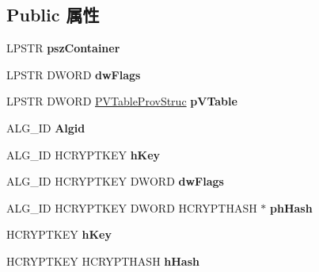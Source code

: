 \subsection*{Public 属性}
\begin{DoxyCompactItemize}
\item 
\mbox{\label{structtag_p_r_o_v_f_u_n_c_s_ae9bd38731e92c115593cecb5da31703e}} 
L\+P\+S\+TR {\bfseries psz\+Container}
\item 
\mbox{\label{structtag_p_r_o_v_f_u_n_c_s_adebac8103e4303495bb23953f9ec3e6d}} 
L\+P\+S\+TR D\+W\+O\+RD {\bfseries dw\+Flags}
\item 
\mbox{\label{structtag_p_r_o_v_f_u_n_c_s_a2a0846f23b6aa81d9a39ae25eb658aa1}} 
L\+P\+S\+TR D\+W\+O\+RD \hyperlink{struct___v_table_prov_struc}{P\+V\+Table\+Prov\+Struc} {\bfseries p\+V\+Table}
\item 
\mbox{\label{structtag_p_r_o_v_f_u_n_c_s_a354607edce501916a5040facf726cd4c}} 
A\+L\+G\+\_\+\+ID {\bfseries Algid}
\item 
\mbox{\label{structtag_p_r_o_v_f_u_n_c_s_a2d685123f290cb43911336f287652b05}} 
A\+L\+G\+\_\+\+ID H\+C\+R\+Y\+P\+T\+K\+EY {\bfseries h\+Key}
\item 
\mbox{\label{structtag_p_r_o_v_f_u_n_c_s_aac8997d99ebdb1caa587be8a33acf001}} 
A\+L\+G\+\_\+\+ID H\+C\+R\+Y\+P\+T\+K\+EY D\+W\+O\+RD {\bfseries dw\+Flags}
\item 
\mbox{\label{structtag_p_r_o_v_f_u_n_c_s_a9db84dfb48d46edd83e10d1c95962f1b}} 
A\+L\+G\+\_\+\+ID H\+C\+R\+Y\+P\+T\+K\+EY D\+W\+O\+RD H\+C\+R\+Y\+P\+T\+H\+A\+SH $\ast$ {\bfseries ph\+Hash}
\item 
\mbox{\label{structtag_p_r_o_v_f_u_n_c_s_a2d685123f290cb43911336f287652b05}} 
H\+C\+R\+Y\+P\+T\+K\+EY {\bfseries h\+Key}
\item 
\mbox{\label{structtag_p_r_o_v_f_u_n_c_s_a2c67c268ec95ccf367c2715aaa8805f6}} 
H\+C\+R\+Y\+P\+T\+K\+EY H\+C\+R\+Y\+P\+T\+H\+A\+SH {\bfseries h\+Hash}

\end{DoxyCompactItemize}
